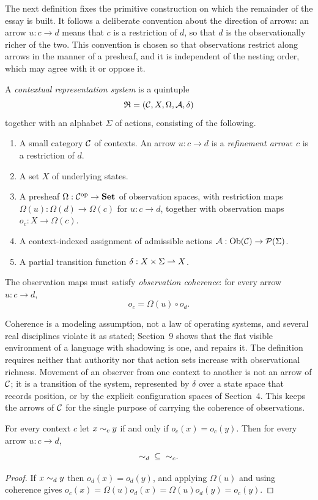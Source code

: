 The next definition fixes the primitive construction on which the remainder of the essay is built. It follows a deliberate convention about the direction of arrows: an arrow $u:c\to d$ means that $c$ is a restriction of $d$, so that $d$ is the observationally richer of the two. This convention is chosen so that observations restrict along arrows in the manner of a presheaf, and it is independent of the nesting order, which may agree with it or oppose it.

\begin{definition}\label{def:crs}
A \emph{contextual representation system} is a quintuple
\[
\mathfrak R=(\mathcal C,X,\Omega,\mathcal A,\delta)
\]
together with an alphabet $\Sigma$ of actions, consisting of the following.
\begin{enumerate}[label=(\arabic*)]
\item A small category $\mathcal C$ of contexts. An arrow $u:c\to d$ is a \emph{refinement arrow}: $c$ is a restriction of $d$.
\item A set $X$ of underlying states.
\item A presheaf $\Omega:\mathcal C^{\mathrm{op}}\to\mathbf{Set}$ of observation spaces, with restriction maps $\Omega(u):\Omega(d)\to\Omega(c)$ for $u:c\to d$, together with observation maps $o_c:X\to\Omega(c)$.
\item A context-indexed assignment of admissible actions $\mathcal A:\mathrm{Ob}(\mathcal C)\to\mathcal P(\Sigma)$.
\item A partial transition function $\delta:X\times\Sigma\rightharpoonup X$.
\end{enumerate}
The observation maps must satisfy \emph{observation coherence}: for every arrow $u:c\to d$,
\[
o_c=\Omega(u)\circ o_d.
\]
\end{definition}

Coherence is a modeling assumption, not a law of operating systems, and several real disciplines violate it as stated; Section~9 shows that the flat visible environment of a language with shadowing is one, and repairs it. The definition requires neither that authority nor that action sets increase with observational richness. Movement of an observer from one context to another is not an arrow of $\mathcal C$; it is a transition of the system, represented by $\delta$ over a state space that records position, or by the explicit configuration spaces of Section~4. This keeps the arrows of $\mathcal C$ for the single purpose of carrying the coherence of observations.

\begin{theorem}\label{thm:refinement}
For every context $c$ let $x\sim_c y$ if and only if $o_c(x)=o_c(y)$. Then for every arrow $u:c\to d$,
\[
{\sim_d}\;\subseteq\;{\sim_c}.
\]
\end{theorem}
\begin{proof}
If $x\sim_d y$ then $o_d(x)=o_d(y)$, and applying $\Omega(u)$ and using coherence gives $o_c(x)=\Omega(u)o_d(x)=\Omega(u)o_d(y)=o_c(y)$.
\end{proof}

